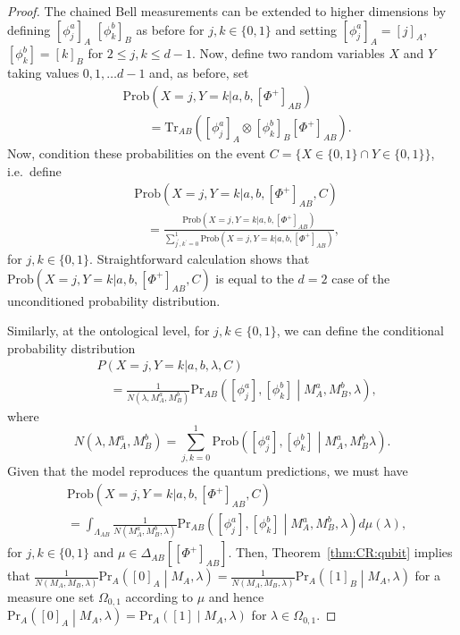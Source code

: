 \documentclass[DIV=calc,fontsize=12pt]{scrartcl} %
\theoremstyle{definition}
\theoremstyle{plain}
\newcommand{\Proj}[1]{\ensuremath{\left [ #1 \right ]}}
\newcommand{\Tr}[2][]{\ensuremath{\text{Tr}_{#1} \left ( #2 \right )}}
\begin{document}
\begin{proof}
The chained Bell measurements can be extended to higher dimensions
by defining $\Proj{\phi^a_j}_A$ $\Proj{\phi^b_k}_B$ as before for
$j,k \in \{0,1\}$ and setting $\Proj{\phi^a_j}_A = \Proj{j}_A$,
$\Proj{\phi^b_k} = \Proj{k}_B$ for $2 \leq j,k \leq d-1$.  Now,
define two random variables $X$ and $Y$ taking values $0,1,\ldots
d-1$ and, as before, set
\begin{align}
&\text{Prob} \left (X = j, Y = k|a,b,\Proj{\Phi^+}_{AB} \right ) \nonumber\\
&\quad\quad=
\Tr[AB]{\Proj{\phi^a_j}_A \otimes \Proj{\phi^b_k}_B \Proj{\Phi^+}_{AB}}.
\end{align}
Now, condition these probabilities on the event $C = \{X \in \{0,1\}
\cap Y \in \{0,1\}\}$, i.e.\ define
\begin{align}
&\text{Prob} \left (X = j, Y = k|a,b,\Proj{\Phi^+}_{AB}, C \right )
\nonumber\\
&\quad= \frac{\text{Prob} \left (X = j, Y = k|a,b,\Proj{\Phi^+}_{AB}
\right )}{\sum_{j^{\prime},k^{\prime} = 0}^1 \text{Prob} \left
(X = j, Y = k|a,b,\Proj{\Phi^+}_{AB} \right )},
\end{align}
for $j,k \in \{0,1\}$.  Straightforward calculation shows that \hfill \break
$\text{Prob} \left (X = j, Y = k|a,b,\Proj{\Phi^+}_{AB}, C \right )$
is equal to the $d=2$ case of the unconditioned probability
distribution.

Similarly, at the ontological level, for $j,k \in \{0,1\}$, we can
define the conditional probability distribution
\begin{align}
&P(X=j,Y=k|a,b,\lambda,C) \nonumber\\
&\quad=
\frac{1}{N(\lambda,M_A^a,M_B^b)}\text{Pr}_{AB} \left ( \Proj{\phi^a_j} ,
\Proj{\phi^b_k} \middle | M_A^a,M_B^b, \lambda \right ),
\end{align}
where
\begin{equation}
N(\lambda,M_A^a,M_B^b) = \sum_{j,k = 0}^1
\text{Prob} \left ( \Proj{\phi^a_{j}}, \Proj{\phi^b_{k}} \middle |
M_A^a, M_B^b \lambda \right ).
\end{equation}
Given that the model reproduces the quantum predictions, we must
have
\begin{align}
&\text{Prob} \left (X = j, Y = k|a,b,\Proj{\Phi^+}_{AB}, C \right )
\nonumber\\
&= \int_{\Lambda_{AB}} \frac{1}{N(M_A^a,M_B^b,\lambda)}
\text{Pr}_{AB} \left ( \Proj{\phi^a_{j}} , \Proj{\phi^b_{k}} \middle
| M_A^a, M_B^b, \lambda \right ) d\mu(\lambda),
\end{align}
for $j,k \in \{0,1\}$ and $\mu \in \Delta_{AB} \left [
\Proj{\Phi^+}_{AB}\right ]$.  Then, Theorem~\ref{thm:CR:qubit}
implies that \break $\frac{1}{N(M_A,M_B,\lambda)}\text{Pr}_A \left (
\Proj{0}_A \middle | M_A, \lambda \right ) =
\frac{1}{N(M_A,M_B,\lambda)} \text{Pr}_A \left ( \Proj{1}_B \middle |
M_A, \lambda \right )$ for a measure one set $\Omega_{0,1}$
according to $\mu$ and hence $\text{Pr}_A \left ( \Proj{0}_A \middle |
M_A, \lambda \right ) = \text{Pr}_A \left ( \Proj{1} \middle | M_A,
\lambda \right )$ for $\lambda \in \Omega_{0,1}$.


\end{proof}
\end{document}
